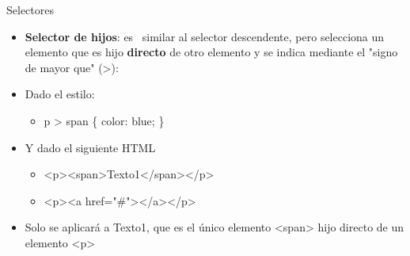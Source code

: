 \documentclass[aspectratio=43,10pt,t]{beamer}
\begin{document}
\begin{frame}{Selectores}\relax
\begingroup
{}
\begin{itemize}
  \item\relax \textbf{Selector de hijos}: es ~similar al selector descendente, pero selecciona un elemento que es hijo \textbf{\textcolor[HTML]{17365D}{directo}} de otro elemento y se indica mediante el "signo de mayor que" (>):
  \item\relax Dado el estilo:
  \begin{itemize}
    \item\relax p > span \{ color: blue; \}
  \end{itemize}
  \item\relax Y dado el siguiente HTML
  \begin{itemize}
    \item\relax <p>\textcolor[HTML]{0070C0}{<span>Texto1</span>}</p>
    \item\relax <p><a href="\#"></a></p>
  \end{itemize}
  \item\relax Solo se aplicará a Texto1, que es el único elemento <span> hijo directo de un elemento <p> 
\end{itemize}
\endgroup
{}
\end{frame}
\end{document}
